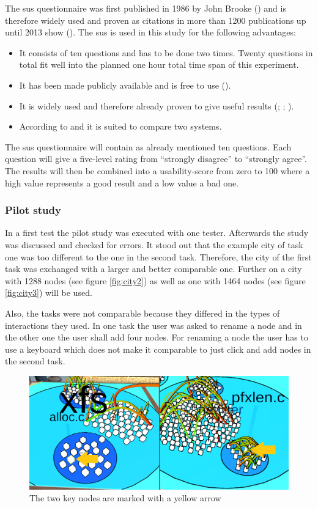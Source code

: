 The \gls{sus} questionnaire was first published in 1986 by John Brooke (\cite{brooke1996sus}) and is therefore widely used and proven as citations in more than 1200 publications up until 2013 show (\cite{brooke2013}).
The \gls{sus} is used in this study for the following advantages: 
\begin{itemize}
  \item It consists of ten questions and has to be done two times. Twenty questions in total fit well into the planned one hour total time span of this experiment.
  \item It has been made publicly available and is free to use (\cite{brooke1996sus}).
  \item It is widely used and therefore already proven to give useful results (\cite{brooke2013}; \cite{lewis2018system}; \cite{grier2013system}).
  \item According to \cite{doi:10.1177/1541931213571043} and \cite{doi:10.1080/10447310802205776} it is suited to compare two systems.
\end{itemize}
The \gls{sus} questionnaire will contain as already mentioned ten questions.
Each question will give a five-level rating from \enquote{strongly disagree} to \enquote{strongly agree}.
The results will then be combined into a \gls{usability}-score from zero to 100 where a high value represents a good result and a low value a bad one.
\subsubsection{Pilot study}
\label{pilot}
In a first test the pilot study was executed with one tester.
Afterwards the study was discussed and checked for errors.
It stood out that the example \gls{city} of task one was too different to the one in the second task.
Therefore, the \gls{city} of the first task was exchanged with a larger and better comparable one.
Further on a \gls{city} with 1288 nodes (see figure \ref{fig:city2}) as well as one with 1464 nodes (see figure \ref{fig:city3}) will be used.

Also, the tasks were not comparable because they differed in the types of interactions they used.
In one task the user was asked to rename a node and in the other one the user shall add four nodes.
For renaming a node the user has to use a keyboard which does not make it comparable to just click and add nodes in the second task.

\begin{figure}[htb]
  \centering
  \includegraphics[width=1\textwidth]{Evaluation/img/task1.png}
  \caption{The two key nodes are marked with a yellow arrow}\label{fig:task1}
\end{figure}

